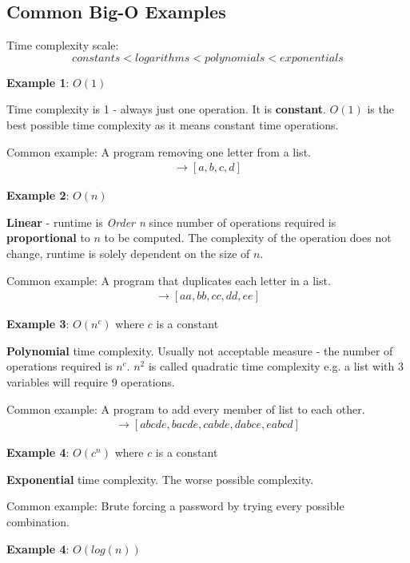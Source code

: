 \documentclass[10pt,a4paper]{article}
\begin{document}
\subsection{Common Big-O Examples}
Time complexity scale:
$$
    constants < logarithms < polynomials < exponentials
$$

\textbf{Example 1}: $O(1)$

Time complexity is 1 - always just one operation. It is \textbf{constant}. $O(1)$ is the best possible time complexity as it
means constant time operations. \par 

Common example: A program removing one letter from a list.
\begin{align*}
    [a,b,c,d,e] \rightarrow [a,b,c,d]
\end{align*}

\textbf{Example 2}: $O(n)$

\textbf{Linear} - runtime is \textit{Order n} since number of operations required is
\textbf{proportional} to $n$ to be computed. The complexity of the operation does not change,
runtime is solely dependent on the size of $n$. \par 

Common example: A program that duplicates each letter in a list.
\begin{align*}
    [a,b,c,d,e] \rightarrow [aa,bb,cc,dd,ee]    
\end{align*}

\textbf{Example 3}: $O(n^c)$ where $c$ is a constant 

\textbf{Polynomial} time complexity. Usually not acceptable measure - the number of operations
required is $n^c$. $n^2$ is called quadratic time complexity e.g. a list with 3 variables will
require 9 operations. \par

Common example: A program to add every member of list to each other.
\begin{align*}
    [a,b,c,d,e] \rightarrow [abcde,bacde,cabde,dabce,eabcd]
\end{align*}

\textbf{Example 4}: $O(c^n)$ where $c$ is a constant

\textbf{Exponential} time complexity. The worse possible complexity. \par 

Common example: Brute forcing a password by trying every possible combination.

\textbf{Example 4}: $O(log(n))$
\end{document}
